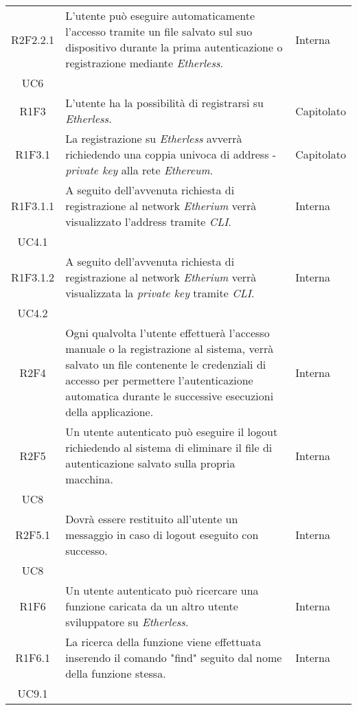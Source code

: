 \begin{longtable}{|c|p{8cm}|C{2cm}|}
	R2F2.2.1 &  L'utente può eseguire automaticamente l'accesso tramite un file salvato sul suo dispositivo durante la prima autenticazione o registrazione mediante \textit{Etherless}.  & \centering Interna \\ UC6 \tabularnewline
	
	R1F3 &  L'utente ha la possibilità di registrarsi su \textit{Etherless}.  & Capitolato \\

	R1F3.1 &  La registrazione su \textit{Etherless} avverrà richiedendo una coppia univoca di address - \textit{private key\glo} alla rete \textit{Ethereum\glos}.  & Capitolato \\
	
	R1F3.1.1 &  A seguito dell'avvenuta richiesta di registrazione al network \textit{Etherium\glo} verrà visualizzato l'address tramite \textit{CLI\glos}.  & \centering Interna \\ UC4.1 \tabularnewline	
	
	R1F3.1.2 &  A seguito dell'avvenuta richiesta di registrazione al network \textit{Etherium\glo} verrà visualizzata la \textit{private key\glo} tramite \textit{CLI\glos}.  & \centering Interna \\ UC4.2 \tabularnewline	
	
	R2F4 &  Ogni qualvolta l'utente effettuerà l'accesso manuale o la registrazione al sistema, verrà salvato un file contenente le credenziali di accesso per permettere l'autenticazione automatica durante le successive esecuzioni della applicazione.  & Interna \\
	
	R2F5 &  Un utente autenticato può eseguire il logout richiedendo al sistema di eliminare il file di autenticazione salvato sulla propria macchina.  & \centering Interna \\ UC8 \tabularnewline
	
	R2F5.1 &  Dovrà essere restituito all'utente un messaggio in caso di logout eseguito con successo.  & \centering Interna \\ UC8 \tabularnewline
	
	R1F6 &  Un utente autenticato può ricercare una funzione caricata da un altro utente sviluppatore su \textit{Etherless}.  & Interna \\
	
	R1F6.1 &  La ricerca della funzione viene effettuata inserendo il comando "find" seguito dal nome della funzione stessa. & \centering Interna \\ UC9.1 \tabularnewline
	

\end{longtable}
